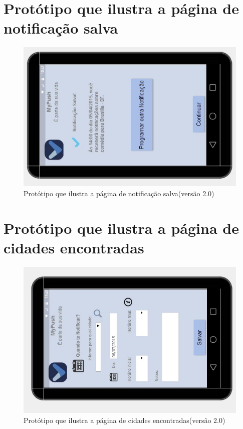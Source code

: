 \begin{apendicesenv}
      \section*{Protótipo que ilustra a página de notificação salva}

    \begin{figure}[!htbp]
      \centering
      \includegraphics[scale=0.5, angle=-90]{editaveis/figuras/prototipo_alta_fidelidade_v2/2_5}
      \caption{Protótipo que ilustra a página de notificação salva(versão 2.0)}
      \label{v2}
    \end{figure}
    
      \section*{Protótipo que ilustra a página de cidades encontradas}

    \begin{figure}[!htbp]
      \centering
      \includegraphics[scale=0.5, angle=-90]{editaveis/figuras/prototipo_alta_fidelidade_v2/2_6}
      \caption{Protótipo que ilustra a página de cidades encontradas(versão 2.0)}
      \label{v2}
    \end{figure}
    

\end{apendicesenv}
